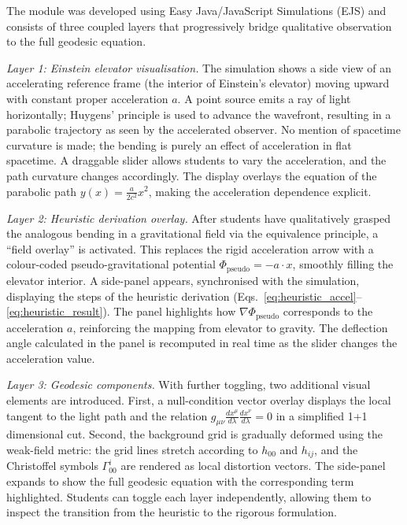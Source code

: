 \documentclass{article}
\begin{document}
The module was developed using Easy Java/JavaScript Simulations (EJS) \cite{christian2011modeling} and consists of three coupled layers that progressively bridge qualitative observation to the full geodesic equation.

\textit{Layer 1: Einstein elevator visualisation.} The simulation shows a side view of an accelerating reference frame (the interior of Einstein’s elevator) moving upward with constant proper acceleration $a$. A point source emits a ray of light horizontally; Huygens’ principle is used to advance the wavefront, resulting in a parabolic trajectory as seen by the accelerated observer. No mention of spacetime curvature is made; the bending is purely an effect of acceleration in flat spacetime. A draggable slider allows students to vary the acceleration, and the path curvature changes accordingly. The display overlays the equation of the parabolic path $y(x) = \frac{a}{2c^2} x^2$, making the acceleration dependence explicit.

\textit{Layer 2: Heuristic derivation overlay.} After students have qualitatively grasped the analogous bending in a gravitational field via the equivalence principle, a “field overlay” is activated. This replaces the rigid acceleration arrow with a colour-coded pseudo-gravitational potential $\Phi_{\text{pseudo}} = -a \cdot x$, smoothly filling the elevator interior. A side-panel appears, synchronised with the simulation, displaying the steps of the heuristic derivation (Eqs.~\ref{eq:heuristic_accel}--\ref{eq:heuristic_result}). The panel highlights how $\nabla \Phi_{\text{pseudo}}$ corresponds to the acceleration $a$, reinforcing the mapping from elevator to gravity. The deflection angle calculated in the panel is recomputed in real time as the slider changes the acceleration value.

\textit{Layer 3: Geodesic components.} With further toggling, two additional visual elements are introduced. First, a null-condition vector overlay displays the local tangent to the light path and the relation $g_{\mu\nu} \frac{dx^\mu}{d\lambda}\frac{dx^\nu}{d\lambda}=0$ in a simplified 1+1 dimensional cut. Second, the background grid is gradually deformed using the weak-field metric: the grid lines stretch according to $h_{00}$ and $h_{ij}$, and the Christoffel symbols $\Gamma^i_{00}$ are rendered as local distortion vectors. The side-panel expands to show the full geodesic equation with the corresponding term highlighted. Students can toggle each layer independently, allowing them to inspect the transition from the heuristic to the rigorous formulation.
\end{document}
